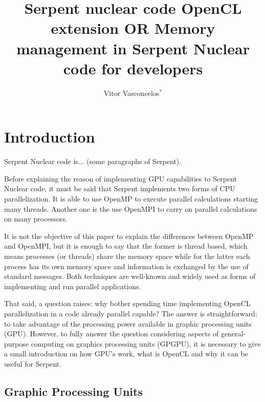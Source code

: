 \documentclass[twoside,a4paper,12pt,english,draft]{anstrans}
\title{Serpent nuclear code OpenCL extension OR Memory management in Serpent Nuclear code
for developers}
\author{Vitor Vasconcelos$^{*}$}
\institute{
  $^{*}$Centro de Desenvolvimento da Tecnologia Nuclear - CDTN, Comiss\~ao Nacional de Energia Nuclear - CNEN,
  Av. Presidente Ant\^onio Carlos 6627, CEP 31270-901, Belo Horizonte - MG, Brazil
}
\begin{document}
\vspace*{-42pt}
\begin{strip}
\vspace*{14pt}
\end{strip}


\section{Introduction}


Serpent Nuclear code is... (some paragraphs of Serpent).



Before explaining the reason of implementing GPU capabilities to Serpent Nuclear code,
it must be said that Serpent implements two forms of CPU parallelization. It is able to use
OpenMP\cite{Dagum1998} to execute parallel calculations starting many threads. Another one
is the use OpenMPI\cite{openmpi2004} to carry on parallel calculations on many processors.

It is not the objective of this paper
to explain the differences between OpenMP and OpenMPI, but it is enough to say that the former
is thread based, which means processes (or threads) share the memory space while for the latter
each process has its own memory space and information is exchanged by the use of standard messages.
Both techniques are well-known and widely used as forms of implementing and run parallel applications.

That said, a question raises: why bother spending time implementing OpenCL parallelization
in a code already parallel capable? The answer is straightforward: to take
advantage of the processing power available in graphic processing units (GPU).
However, to fully answer the question considering aspects of general-purpose computing on graphics
processing units (GPGPU), it is necessary to give a small introduction on how GPU's work, what is OpenCL and why
it can be useful for Serpent.

\subsection{Graphic Processing Units}
\end{document}
